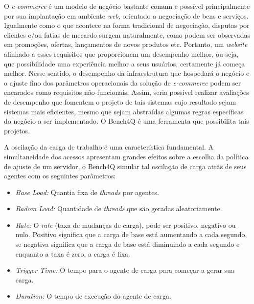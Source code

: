 O \textit{ e-commerce} é um modelo de negócio bastante comum e possível principalmente por sua implantação em ambiente \textit{ web}, orientado a negociação de bens e serviços. Igualmente como o que acontece na forma tradicional de negociação, disputas por clientes e/ou fatias de mecardo surgem naturalmente, como podem ser observadas em promoções, ofertas, lançamentos de novos produtos etc. Portanto, um \textit{ website} alinhado a esses requisitos que proporcionem um desempenho melhor, ou seja, que possibilidade uma experiência melhor a seus usuários, certamente já começa melhor. Nesse sentido, o desempenho da infraestrutura que hospedará o negócio e o ajuste fino dos parâmetros operacionais da solução de \textit{ e-commerce} podem ser encarados como requisitos não-funcionais. Assim, seria possível realizar avaliações de desempenho que fomentem o projeto de tais sistemas cujo resultado sejam sistemas mais eficientes, mesmo que sejam abstraídas algumas regras específicas do negócio a ser implementado. O Bench4Q é uma ferramenta que possibilita tais projetos.

A oscilação da carga de trabalho é uma característica fundamental. A simultaneidade dos acessos apresentam grandes efeitos sobre a escolha da política de ajuste de um servidor, o Bench4Q simular tal oscilação de carga atrás de seus agentes com os seguintes parâmetros:

\begin{itemize}
	\item \textit{Base Load:} Quantia fixa de \textit{threads} por agentes.
	\item \textit{Radom Load:} Quantidade de \textit{threads} que são geradas aleatoriamente.
	\item \textit{Rate:} O \textit{rate} (taxa de mudanças de carga), pode ser positivo, negativo ou nulo. Positivo significa que a carga de base está aumentando a cada segundo, se negativa significa que a carga de base está diminuindo a cada segundo e enquanto a taxa é zero, a carga é fixa.
	\item \textit{Trigger Time:} O tempo para o agente de carga para começar a gerar sua carga.
	\item \textit{Duration:} O tempo de execução do agente de carga.
\end{itemize}

